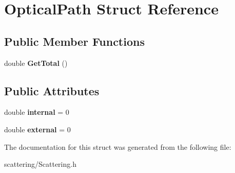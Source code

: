 \hypertarget{struct_optical_path}{}\section{Optical\+Path Struct Reference}
\label{struct_optical_path}
\subsection*{Public Member Functions}
\begin{DoxyCompactItemize}
\item 
\mbox{\label{struct_optical_path_a387fb1a12b74bb1b1589f19e74b13af1}} 
double {\bfseries Get\+Total} ()
\end{DoxyCompactItemize}
\subsection*{Public Attributes}
\begin{DoxyCompactItemize}
\item 
\mbox{\label{struct_optical_path_af1521166cf4e510161ed127cdee12b82}} 
double {\bfseries internal} = 0
\item 
\mbox{\label{struct_optical_path_a4c8fa24427bf6641772fa9939c0eca77}} 
double {\bfseries external} = 0
\end{DoxyCompactItemize}


The documentation for this struct was generated from the following file\+:\begin{DoxyCompactItemize}
\item 
scattering/Scattering.\+h\end{DoxyCompactItemize}
